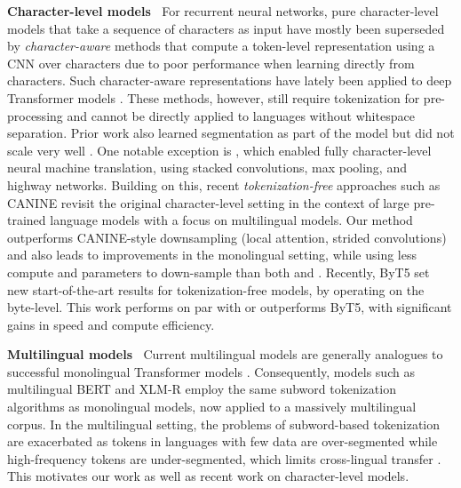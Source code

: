 \documentclass{article} \usepackage{iclr2022_conference,times}
\begin{document}
\noindent \textbf{Character-level models} $\:$ For recurrent neural networks, pure character-level models that take a sequence of characters as input \citep{graves2013generating,Zhang2015character,hwang2017character} have mostly been superseded by \emph{character-aware} methods that compute a token-level representation using a CNN over characters \citep{kim2016character,jozefowicz2016exploring,Peters2018elmo} due to poor performance when learning directly from characters. Such character-aware representations have lately been applied to deep Transformer models \citep{el-boukkouri-etal-2020-characterbert,ma-etal-2020-charbert}. These methods, however, still require tokenization for pre-processing and cannot be directly applied to languages without whitespace separation. Prior work also learned segmentation as part of the model but did not scale very well \citep{wang2017sequence,kreutzer2018learning, kawakami-etal-2019-learning}. One notable exception is \citep{lee-etal-2017-fully}, which enabled fully character-level neural machine translation, using stacked convolutions, max pooling, and highway networks. Building on this, recent \emph{tokenization-free} approaches such as CANINE \citep{clark2021canine} 
revisit the original character-level setting in the context of large pre-trained language models with a focus on multilingual models. Our method outperforms CANINE-style downsampling (local attention, strided convolutions) and also leads to improvements in the monolingual setting, while using less compute and parameters to down-sample than both \citet{lee-etal-2017-fully} and \citet{clark2021canine}.  Recently, ByT5 \citep{Xue2021byt5} set new start-of-the-art results for tokenization-free models, by operating on the byte-level. This work performs on par with or outperforms ByT5, with significant gains in speed and compute efficiency. 

\noindent \textbf{Multilingual models} $\:$ Current multilingual models are generally analogues to successful monolingual Transformer models \citep{ruder2021xtreme-r}. Consequently, models such as multilingual BERT \citep{Devlin2019bert} and XLM-R \citep{conneau-etal-2020-unsupervised} employ the same subword tokenization algorithms as monolingual models, now applied to a massively multilingual corpus. In the multilingual setting, the problems of subword-based tokenization are exacerbated as tokens in languages with few data are over-segmented while high-frequency tokens are under-segmented, which limits cross-lingual transfer \citep{Wang2021multi-view}. This motivates our work as well as recent work on character-level models.
\end{document}
